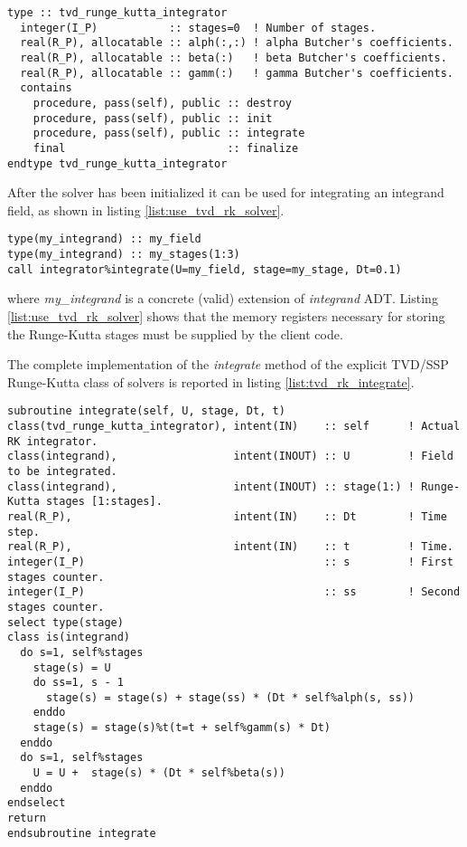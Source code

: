 \documentclass[pdftex,preprint,3p,times,numbers]{elsarticle}
\begin{document}
\begin{lstlisting}[firstnumber=1,style=code,caption={definition of \emph{tvd\_runge\_kutta\_integrator} type},label={list:tvd_rk_solver}]
type :: tvd_runge_kutta_integrator
  integer(I_P)           :: stages=0  ! Number of stages.
  real(R_P), allocatable :: alph(:,:) ! alpha Butcher's coefficients.
  real(R_P), allocatable :: beta(:)   ! beta Butcher's coefficients.
  real(R_P), allocatable :: gamm(:)   ! gamma Butcher's coefficients.
  contains
    procedure, pass(self), public :: destroy
    procedure, pass(self), public :: init
    procedure, pass(self), public :: integrate
    final                         :: finalize
endtype tvd_runge_kutta_integrator
\end{lstlisting}

After the solver has been initialized it can be used for integrating an integrand field, as shown in listing \ref{list:use_tvd_rk_solver}.

\begin{lstlisting}[firstnumber=1,style=code,caption={example of usage of a TVD/SSP Runge-Kutta integrator},label={list:use_tvd_rk_solver}]
type(my_integrand) :: my_field
type(my_integrand) :: my_stages(1:3)
call integrator%integrate(U=my_field, stage=my_stage, Dt=0.1)
\end{lstlisting}
where \emph{my\_integrand} is a concrete (valid) extension of \emph{integrand} ADT. Listing \ref{list:use_tvd_rk_solver} shows that the memory registers necessary for storing the Runge-Kutta stages must be supplied by the client code.

The complete implementation of the \emph{integrate} method of the explicit TVD/SSP Runge-Kutta class of solvers is reported in listing \ref{list:tvd_rk_integrate}.

\begin{lstlisting}[firstnumber=1,style=code,caption={implementation of the \emph{integrate} method of explicit TVD/SSP Runge-Kutta class},label={list:tvd_rk_integrate}]
subroutine integrate(self, U, stage, Dt, t)
class(tvd_runge_kutta_integrator), intent(IN)    :: self      ! Actual RK integrator.
class(integrand),                  intent(INOUT) :: U         ! Field to be integrated.
class(integrand),                  intent(INOUT) :: stage(1:) ! Runge-Kutta stages [1:stages].
real(R_P),                         intent(IN)    :: Dt        ! Time step.
real(R_P),                         intent(IN)    :: t         ! Time.
integer(I_P)                                     :: s         ! First stages counter.
integer(I_P)                                     :: ss        ! Second stages counter.
select type(stage)
class is(integrand)
  do s=1, self%stages
    stage(s) = U
    do ss=1, s - 1
      stage(s) = stage(s) + stage(ss) * (Dt * self%alph(s, ss))
    enddo
    stage(s) = stage(s)%t(t=t + self%gamm(s) * Dt)
  enddo
  do s=1, self%stages
    U = U +  stage(s) * (Dt * self%beta(s))
  enddo
endselect
return
endsubroutine integrate
\end{lstlisting}
\end{document}
